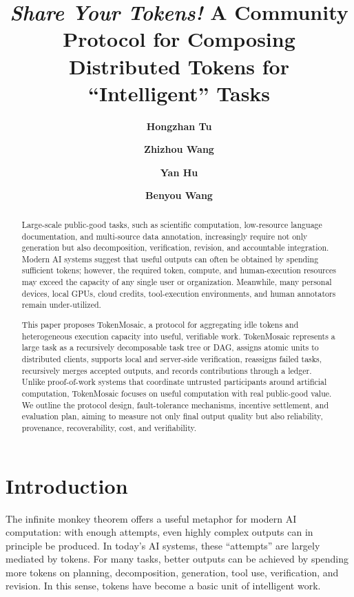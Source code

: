 \documentclass{article}
\title{\textit{Share Your Tokens!}  A  Community Protocol for Composing Distributed Tokens  for   ``Intelligent'' Tasks}
\author[1$\dagger$]{\textbf{Hongzhan Tu}}
\author[1$\dagger$]{\textbf{Zhizhou  Wang}}
\author[1,2*]{\textbf{Yan Hu}}
\author[1,2,3,4*]{\textbf{Benyou Wang}}
\affil[1]{The Chinese University of Hong Kong, Shenzhen, China}
\affil[2]{National Health Data Institute (Shenzhen),}
\affil[3]{Shenzhen Loop Area Institute}
\affil[4]{Shenzhen Research Institute of Big Data, Shenzhen, China}
\affil[*]{{huyan,wangbenyou@cuhk.edu.cn}}
\affil[-]{\url{https://tokenmosaic.github.io/}}
\theoremstyle{plain}
\begin{document}


\maketitle

\begin{abstract}
Large-scale public-good tasks, such as scientific computation, low-resource language documentation, and multi-source data annotation, increasingly require not only generation but also decomposition, verification, revision, and accountable integration. Modern AI systems suggest that useful outputs can often be obtained by spending sufficient tokens; however, the required token, compute, and human-execution resources may exceed the capacity of any single user or organization. Meanwhile, many personal devices, local GPUs, cloud credits, tool-execution environments, and human annotators remain under-utilized.

This paper proposes TokenMosaic, a protocol for aggregating idle tokens and heterogeneous execution capacity into useful, verifiable work. TokenMosaic represents a large task as a recursively decomposable task tree or DAG, assigns atomic units to distributed clients, supports local and server-side verification, reassigns failed tasks, recursively merges accepted outputs, and records contributions through a ledger. Unlike proof-of-work systems that coordinate untrusted participants around artificial computation, TokenMosaic focuses on useful computation with real public-good value. We outline the protocol design, fault-tolerance mechanisms, incentive settlement, and evaluation plan, aiming to measure not only final output quality but also reliability, provenance, recoverability, cost, and verifiability.
\end{abstract}

\section{Introduction}


The infinite monkey theorem offers a useful metaphor for modern AI computation: with enough attempts, even highly complex outputs can in principle be produced. In today’s AI systems, these “attempts” are largely mediated by tokens. For many tasks, better outputs can be achieved by spending more tokens on planning, decomposition, generation, tool use, verification, and revision. In this sense, tokens have become a basic unit of intelligent work.
\end{document}
